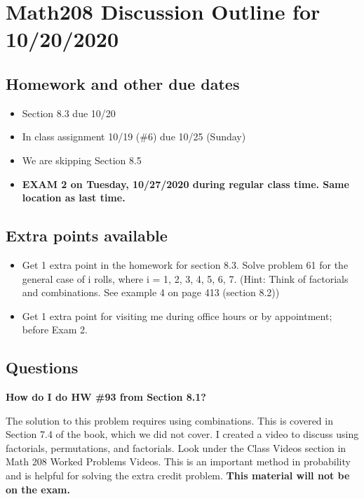 \documentclass[17pt]{extarticle}
\begin{document}
\section*{Math208 Discussion Outline for 10/20/2020}

\subsection{Homework and other due dates}
\begin{itemize}
\item Section 8.3 due 10/20
\item In class assignment 10/19 (\#6) due 10/25 (Sunday)
\item We are skipping Section 8.5
\item \textbf{EXAM 2 on Tuesday, 10/27/2020 during regular class time. Same location as last time.}
\end{itemize}

\subsection{Extra points available}
\begin{itemize}
\item Get 1 extra point in the homework for section 8.3. Solve problem 61 for the general case of i rolls, where i = 1, 2, 3, 4, 5, 6, 7. (Hint:  Think of factorials and combinations. See example 4 on page 413 (section 8.2))
\item Get 1 extra point for visiting me during office hours or by appointment; before Exam 2.
\end{itemize}

\subsection{Questions}
\textbf{How do I do HW \#93 from Section 8.1?}

\setlength{\leftskip}{1cm}

The solution to this problem requires using combinations. This is covered in Section 7.4 of the book, which we did not cover. I created a video to discuss using factorials, permutations, and factorials. Look under the Class Videos section in Math 208 Worked Problems Videos. This is an important method in probability and is helpful for solving the extra credit problem. \textbf{This material will not be on the exam.}

\setlength{\leftskip}{0pt}
\end{document}
